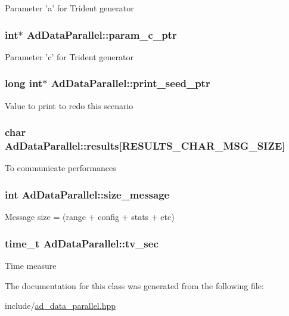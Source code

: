 \-Parameter 'a' for \-Trident generator \hypertarget{classAdDataParallel_ade1456a48c972070bab91e0a93cd61dd}{
\subsubsection[{param\-\_\-c\-\_\-ptr}]{\setlength{\rightskip}{0pt plus 5cm}int$\ast$ {\bf \-Ad\-Data\-Parallel\-::param\-\_\-c\-\_\-ptr}}}\label{classAdDataParallel_ade1456a48c972070bab91e0a93cd61dd}
\-Parameter 'c' for \-Trident generator \hypertarget{classAdDataParallel_a5391ad235753151f07dfc1c01d58e88d}{
\subsubsection[{print\-\_\-seed\-\_\-ptr}]{\setlength{\rightskip}{0pt plus 5cm}long int$\ast$ {\bf \-Ad\-Data\-Parallel\-::print\-\_\-seed\-\_\-ptr}}}\label{classAdDataParallel_a5391ad235753151f07dfc1c01d58e88d}
\-Value to print to redo this scenario \hypertarget{classAdDataParallel_a4919da41f748bd6286d59c9c9f72c344}{
\subsubsection[{results}]{\setlength{\rightskip}{0pt plus 5cm}char {\bf \-Ad\-Data\-Parallel\-::results}\mbox{[}\-R\-E\-S\-U\-L\-T\-S\-\_\-\-C\-H\-A\-R\-\_\-\-M\-S\-G\-\_\-\-S\-I\-Z\-E\mbox{]}}}\label{classAdDataParallel_a4919da41f748bd6286d59c9c9f72c344}
\-To communicate performances \hypertarget{classAdDataParallel_a5ecf007c3aa55587262e26277f57bdf3}{
\subsubsection[{size\-\_\-message}]{\setlength{\rightskip}{0pt plus 5cm}int {\bf \-Ad\-Data\-Parallel\-::size\-\_\-message}}}\label{classAdDataParallel_a5ecf007c3aa55587262e26277f57bdf3}
\-Message size = (range + config + stats + etc) \hypertarget{classAdDataParallel_ac69a52aa7b4b4b9c61f9bfaea3ec2143}{
\subsubsection[{tv\-\_\-sec}]{\setlength{\rightskip}{0pt plus 5cm}time\-\_\-t {\bf \-Ad\-Data\-Parallel\-::tv\-\_\-sec}}}\label{classAdDataParallel_ac69a52aa7b4b4b9c61f9bfaea3ec2143}
\-Time measure 

\-The documentation for this class was generated from the following file\-:\begin{DoxyCompactItemize}
\item 
include/\hyperlink{ad__data__parallel_8hpp}{ad\-\_\-data\-\_\-parallel.\-hpp}\end{DoxyCompactItemize}
